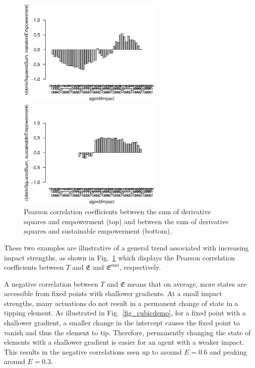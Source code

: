 \documentclass[conference]{IEEEtran}
\newcommand{\empowerment}{\ensuremath{\mathfrak{E}}}
\newcommand{\sustainableempowerment}{\ensuremath{\empowerment^{\mathrm{sust}}}}
\newcommand{\sumderivsquares}{\ensuremath{T}}
\newcommand{\impactstrength}{\ensuremath{E}}
\begin{document}
\begin{figure}

  \begin{center}

    \includegraphics[width=7cm]{n08_full_small_corr_dss_emp.eps}

    \includegraphics[width=7cm]{n08_full_small_corr_dss_empsust.eps}

  \end{center}

  \caption{Pearson correlation coefficients between the sum of derivative
    squares and empowerment (top) and between the sum of derivative
    squares and sustainable empowerment (bottom).}
  \label{fig_dssempcorr}

\end{figure}

These two examples are illustrative of a general trend associated with
increasing impact strengths, as shown in Fig.~\ref{fig_dssempcorr}
which displays the Pearson correlation coefficients between
$\sumderivsquares$ and $\empowerment$ and $\sustainableempowerment$,
respectively.

A negative correlation between $\sumderivsquares$ and $\empowerment$
means that on average, more states are accessible from fixed points
with shallower gradients. At a small impact strengths, many actuations
do not result in a permanent change of state in a tipping element. As
illustrated in Fig.~\ref{fig_cubicdemo}, for a fixed point with a
shallower gradient, a smaller change in the intercept causes the fixed
point to vanish and thus the element to tip. Therefore, permanently
changing the state of elements with a shallower gradient is easier for
an agent with a weaker impact. This results in the negative
correlations seen up to around $\impactstrength = 0.6$ and peaking around $\impactstrength = 0.3$.
\end{document}
